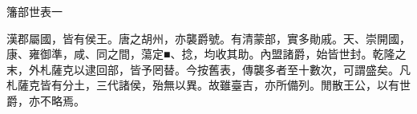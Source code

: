 
\begin{pinyinscope}
籓部世表一

漢郡屬國，皆有侯王。唐之胡州，亦襲爵號。有清蒙部，實多勛戚。天、崇開國，康、雍御準，咸、同之間，蕩定■、捻，均收其助。內盟諸爵，始皆世封。乾隆之末，外札薩克以逮回部，皆予罔替。今按舊表，傳襲多者至十數次，可謂盛矣。凡札薩克皆有分土，三代諸侯，殆無以異。故雖臺吉，亦所備列。閒散王公，以有世爵，亦不略焉。


\end{pinyinscope}